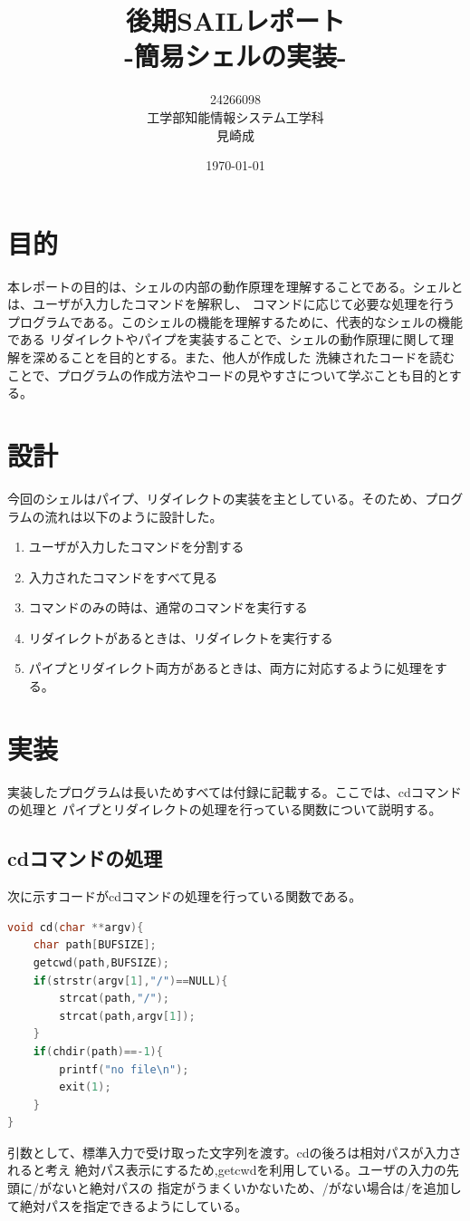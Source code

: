 \documentclass[a4j, twocolumn]{ltjsarticle}
\title{後期SAILレポート\\
-簡易シェルの実装-}
\author{24266098\\
工学部知能情報システム工学科\\
見崎成}
\date{\today}
\begin{document}
\maketitle

  \section{目的}
  本レポートの目的は、シェルの内部の動作原理を理解することである。シェルとは、ユーザが入力したコマンドを解釈し、
  コマンドに応じて必要な処理を行うプログラムである。このシェルの機能を理解するために、代表的なシェルの機能である
  リダイレクトやパイプを実装することで、シェルの動作原理に関して理解を深めることを目的とする。また、他人が作成した
  洗練されたコードを読むことで、プログラムの作成方法やコードの見やすさについて学ぶことも目的とする。

  \section{設計}
    今回のシェルはパイプ、リダイレクトの実装を主としている。そのため、プログラムの流れは以下のように設計した。
    \begin{enumerate}
      \item ユーザが入力したコマンドを分割する
      \item 入力されたコマンドをすべて見る
      \item コマンドのみの時は、通常のコマンドを実行する
      \item リダイレクトがあるときは、リダイレクトを実行する
      \item パイプとリダイレクト両方があるときは、両方に対応するように処理をする。
    \end{enumerate}
  
  \section{実装}
    実装したプログラムは長いためすべては付録に記載する。ここでは、cdコマンドの処理と
    パイプとリダイレクトの処理を行っている関数について説明する。
    \subsection{cdコマンドの処理}
      次に示すコードがcdコマンドの処理を行っている関数である。
      \begin{lstlisting}[language=C,caption=cdコマンドの処理]
void cd(char **argv){
	char path[BUFSIZE];
	getcwd(path,BUFSIZE);
	if(strstr(argv[1],"/")==NULL){
		strcat(path,"/");
		strcat(path,argv[1]);
	}
	if(chdir(path)==-1){
		printf("no file\n");
		exit(1);
	}
}
      \end{lstlisting}
      引数として、標準入力で受け取った文字列を渡す。cdの後ろは相対パスが入力されると考え
      絶対パス表示にするため,getcwdを利用している。ユーザの入力の先頭に/がないと絶対パスの
      指定がうまくいかないため、/がない場合は/を追加して絶対パスを指定できるようにしている。
\end{document}
